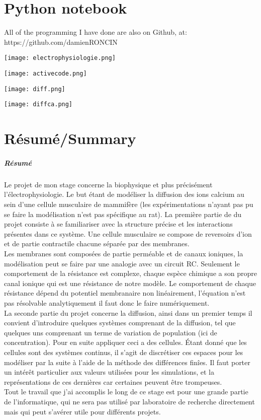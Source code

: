 \documentclass[a4paper,11pt]{report}
\begin{document}
\chapter{Python notebook}
All of the programming I have done are also on Github, at: 
https://github.com/damienRONCIN\\
\begin{center}
\texttt{[image: electrophysiologie.png]} 
\end{center} 
\begin{center}
\texttt{[image: activecode.png]} 
\end{center} 
\begin{center}
\texttt{[image: diff.png]} 
\end{center}
\begin{center}
\texttt{[image: diffca.png]} 
\end{center}
\chapter{Résumé/Summary}
\paragraph{Résumé}
Le projet de mon stage concerne la biophysique et plus précisément l’électrophysiologie. Le but étant de modéliser la diffusion des ions calcium au sein d'une cellule musculaire de mammifère (les expérimentations n'ayant pas pu se faire la modélisation n'est pas spécifique au rat). La première partie de du projet consiste à se familiariser avec la structure précise et les interactions présentes dans ce système. Une cellule musculaire se compose de reversoirs d'ion et de partie contractile chacune séparée par des membranes. \\
Les membranes sont composées de partie perméable et de canaux ioniques, la modélisation peut se faire par une analogie avec un circuit RC. Seulement le comportement de la résistance est complexe, chaque espèce chimique a son propre canal ionique qui est une résistance de notre modèle. Le comportement de chaque résistance dépend du potentiel membranaire non linéairement, l'équation n'est pas résolvable analytiquement il faut donc le faire numériquement. \\
La seconde partie du projet concerne la diffusion, ainsi dans un premier temps il convient d'introduire quelques systèmes comprenant de la diffusion, tel que quelques uns comprenant un terme de variation de population (ici  de concentration). Pour en suite appliquer ceci a des cellules. Étant donné que les cellules sont des systèmes continus, il s'agit de discrétiser ces espaces pour les modéliser par la suite à l'aide de la méthode des  différences finîes. Il faut porter un intérêt particulier aux valeurs utilisées pour les simulations, et la représentations de ces dernières car certaines peuvent être trompeuses. \\
Tout le travail que j'ai accomplis le long de ce stage est pour une grande partie de l'informatique, qui ne sera pas utilisé par laboratoire de recherche directement mais qui peut s’avérer utile pour différents projets. 
\end{document}
